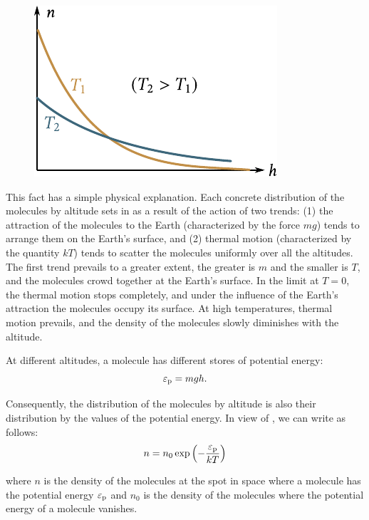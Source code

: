 \begin{figure}[t]
	\begin{center}
		\includegraphics[scale=1.0]{figures/ch_11/fig_11_22.pdf}
		\caption[]{}
		\label{fig:11_22}
	\end{center}
	\vspace{-0.5cm}
\end{figure}

This fact has a simple physical explanation. Each concrete distribution of the molecules by altitude sets in as a result of the action of two trends: (1) the attraction of the molecules to the Earth (characterized by the force $mg$) tends to arrange them on the Earth's surface, and (2) thermal motion (characterized by the quantity $kT$) tends to scatter the molecules uniformly over all the altitudes. The first trend prevails to a greater extent, the greater is $m$ and the smaller is $T$, and the molecules crowd together at the Earth's surface. In the limit at $T=0$, the thermal motion stops completely, and under the influence of the Earth's attraction the molecules occupy its surface. At high temperatures, thermal motion prevails, and the density of the molecules slowly diminishes with the altitude.

At different altitudes, a molecule has different stores of potential energy:
\begin{equation}\label{eq:11_76}
	\varepsilon_{\text{p}} = mgh.
\end{equation}

\noindent
Consequently, the distribution of the molecules by altitude is also their distribution by the values of the potential energy. In view of , we can write  as follows:
\begin{equation}\label{eq:11_77}
	n = n_0 \exp\left(-\frac{\varepsilon_{\text{p}}}{kT}\right)
\end{equation}

\noindent
where $n$ is the density of the molecules at the spot in space where a molecule has the potential energy $\varepsilon_{\text{p}}$ and $n_0$ is the density of the molecules where the potential energy of a molecule vanishes.

